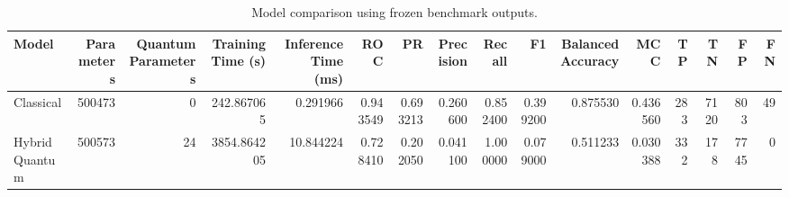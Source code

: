 \begin{table}
\caption{Model comparison using frozen benchmark outputs.}
\label{tab:model_comparison}
\begin{tabular}{lrrrrrrrrrrrrrrr}
\toprule
Model & Parameters & Quantum Parameters & Training Time (s) & Inference Time (ms) & ROC & PR & Precision & Recall & F1 & Balanced Accuracy & MCC & TP & TN & FP & FN \\
\midrule
Classical & 500473 & 0 & 242.867065 & 0.291966 & 0.943549 & 0.693213 & 0.260600 & 0.852400 & 0.399200 & 0.875530 & 0.436560 & 283 & 7120 & 803 & 49 \\
Hybrid Quantum & 500573 & 24 & 3854.864205 & 10.844224 & 0.728410 & 0.202050 & 0.041100 & 1.000000 & 0.079000 & 0.511233 & 0.030388 & 332 & 178 & 7745 & 0 \\
\bottomrule
\end{tabular}
\end{table}
